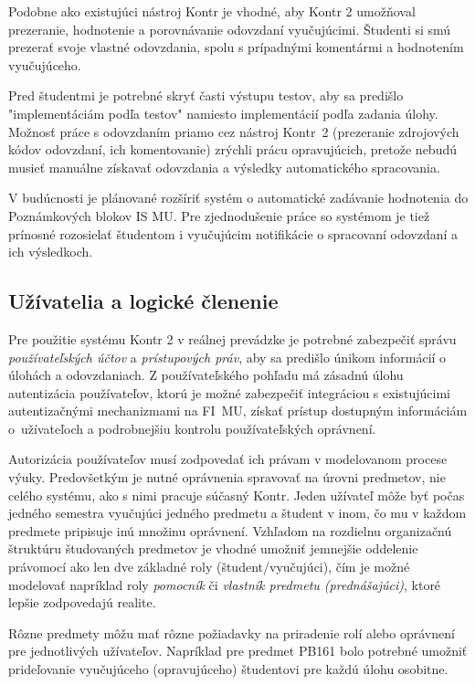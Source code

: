 \documentclass[
  digital, %
  twoside, %
  table,   %
  lof,     %
  lot,     %
]{fithesis3}
\begin{document}
Podobne ako existujúci nástroj Kontr je vhodné, aby Kontr 2 umožňoval prezeranie, hodnotenie a porovnávanie odovzdaní vyučujúcimi. Študenti si smú prezerať svoje vlastné odovzdania, spolu s prípadnými komentármi a hodnotením vyučujúceho. 

Pred študentmi je potrebné skryť časti výstupu testov, aby sa predišlo "implementáciám podľa testov" namiesto implementácií podľa zadania úlohy. Možnosť práce s odovzdaním priamo cez nástroj Kontr~2 (prezeranie zdrojových kódov odovzdaní, ich komentovanie) zrýchli prácu opravujúcich, pretože nebudú musieť manuálne získavať odovzdania a výsledky automatického spracovania. 

V budúcnosti je plánované rozšíriť systém o automatické zadávanie hodnotenia do Poznámkových blokov IS MU. Pre zjednodušenie práce so systémom je tiež prínosné rozosielať študentom i vyučujúcim notifikácie o spracovaní odovzdaní a ich výsledkoch. 

\subsection{Užívatelia a logické členenie}

Pre použitie systému Kontr 2 v reálnej prevádzke je potrebné zabezpečiť správu \emph{používateľských účtov} a \emph{prístupových práv}, aby sa predišlo únikom informácií o úlohách a odovzdaniach. Z používateľského pohľadu má zásadnú úlohu autentizácia používateľov, ktorú je možné zabezpečiť integráciou s existujúcimi autentizačnými mechanizmami na FI~MU, získať prístup dostupným informáciám o~užívateľoch a podrobnejšiu kontrolu používateľských oprávnení.

Autorizácia používateľov musí zodpovedať ich právam v modelovanom procese výuky. Predovšetkým je nutné oprávnenia spravovať na úrovni predmetov, nie celého systému, ako s nimi pracuje súčasný Kontr. Jeden užívateľ môže byť počas jedného semestra vyučujúci jedného predmetu a študent v inom, čo mu v každom predmete pripisuje inú množinu oprávnení. Vzhľadom na rozdielnu organizačnú štruktúru študovaných predmetov je vhodné umožniť jemnejšie oddelenie právomocí ako len dve základné roly (študent/vyučujúci), čím je možné modelovať napríklad roly \emph{pomocník} či \emph{vlastník predmetu (prednášajúci)}, ktoré lepšie zodpovedajú realite.

Rôzne predmety môžu mať rôzne požiadavky na priradenie rolí alebo oprávnení pre jednotlivých užívateľov. Napríklad pre predmet PB161 bolo potrebné umožniť prideľovanie vyučujúceho (opravujúceho) študentovi pre každú úlohu osobitne.
\end{document}
